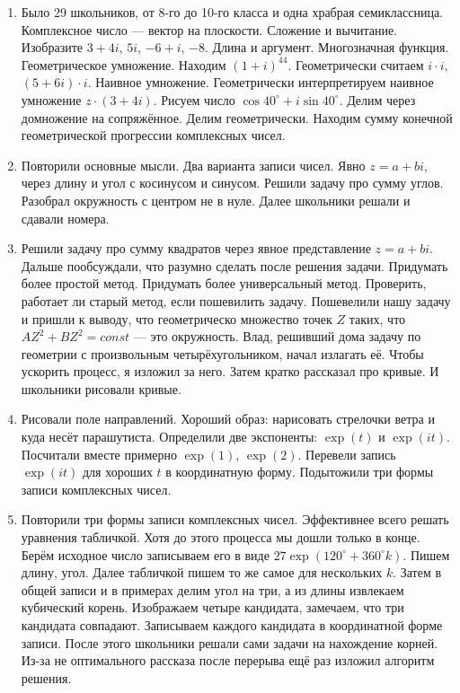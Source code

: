 \documentclass[12pt]{article}
\theoremstyle{definition}
\begin{document}
\begin{enumerate}
  \item Было 29 школьников, от 8-го до 10-го класса и одна храбрая семиклассница. Комплексное число — вектор на плоскости.
  Сложение и вычитание. Изобразите $3+4i$, $5i$, $-6 + i$, $-8$. Длина и аргумент. Многозначная функция. 
  Геометрическое умножение. Находим $(1+i)^{44}$. Геометрически считаем $i \cdot i$, $(5 + 6i) \cdot i$. Наивное умножение.
  Геометрически интерпретируем наивное умножение $z \cdot (3 + 4i)$.
  Рисуем число $\cos 40^{\circ} + i \sin 40^{\circ}$. Делим через домножение на сопряжённое.
  Делим геометрически. Находим сумму конечной геометрической прогрессии комплексных чисел. 
  \item Повторили основные мысли. Два варианта записи чисел. Явно $z=a + bi$, через длину и угол с косинусом и синусом.
  Решили задачу про сумму углов. Разобрал окружность с центром не в нуле. Далее школьники решали и сдавали номера.
  \item Решили задачу про сумму квадратов через явное представление $z=a+bi$.
  Дальше пообсуждали, что разумно сделать после решения задачи. 
  Придумать более простой метод. Придумать более универсальный метод. 
  Проверить, работает ли старый метод, если пошевилить задачу.
  Пошевелили нашу задачу и пришли к выводу, что геометрическо множество точек $Z$ таких, что
  $AZ^2 + BZ^2 = const$ — это окружность. 
  Влад, решивший дома задачу по геометрии с произвольным четырёхугольником, начал излагать её. 
  Чтобы ускорить процесс, я изложил за него. Затем кратко рассказал про кривые. 
  И школьники рисовали кривые. 
  \item Рисовали поле направлений. Хороший образ: нарисовать стрелочки ветра и куда несёт парашутиста. 
  Определили две экспоненты: $\exp(t)$ и $\exp(it)$. Посчитали вместе примерно $\exp(1)$, $\exp(2)$.
  Перевели запись $\exp(it)$ для хороших $t$ в координатную форму. Подытожили три формы записи комплексных чисел. 
  \item Повторили три формы записи комплексных чисел. Эффективнее всего решать уравнения табличкой. Хотя до этого процесса мы 
  дошли только в конце. 
  Берём исходное число записываем его в виде $27 \exp(120^{\circ} + 360^{\circ}k)$. Пишем длину, угол. 
  Далее табличкой пишем то же самое для нескольких $k$. Затем в общей записи и в примерах делим угол на три, а из длины извлекаем 
  кубический корень. Изображаем четыре кандидата, замечаем, что три кандидата совпадают. Записываем каждого кандидата в координатной форме записи.
  После этого школьники решали сами задачи на нахождение корней. Из-за не оптимального рассказа после перерыва ещё раз изложил алгоритм решения. 

\end{enumerate}
\end{document}
